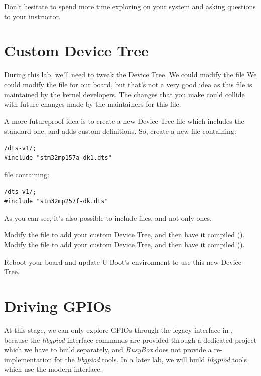Don't hesitate to spend more time exploring  on your system
and asking questions to your instructor.

\section{Custom Device Tree}
During this lab, we'll need to tweak the Device Tree.
\if{}
We could modify the  file
\fi
\if{}
We could modify the  file
\fi
for our board, but that's not a very good idea as this file is
maintained by the kernel developers. The changes that you make could
collide with future changes made by the maintainers for this file.

A more futureproof idea is to create a new Device Tree file which
includes the standard one, and adds custom definitions. So, create a
new
\if{}
 file containing:
\begin{verbatim}
/dts-v1/;
#include "stm32mp157a-dk1.dts"
\end{verbatim}
\fi
\if{}
 file containing:
\begin{verbatim}
/dts-v1/;
#include "stm32mp257f-dk.dts"
\end{verbatim}
\fi

As you can see, it's also possible to include  files, and not
only  ones.

\if{}
Modify the  file to add your custom
Device Tree, and then have it compiled ().
\fi
\if{}
Modify the  file to add your custom
Device Tree, and then have it compiled ().
\fi

Reboot your board and update U-Boot's environment to use this new Device Tree.

\section{Driving GPIOs}

At this stage, we can only explore GPIOs through the legacy interface
in , because the {\em libgpiod} interface
commands are provided through a dedicated project which we have to
build separately, and {\em BusyBox} does not provide a
re-implementation for the {\em libgpiod} tools. In a later lab, we
will build {\em libgpiod} tools which use the modern
 interface.

